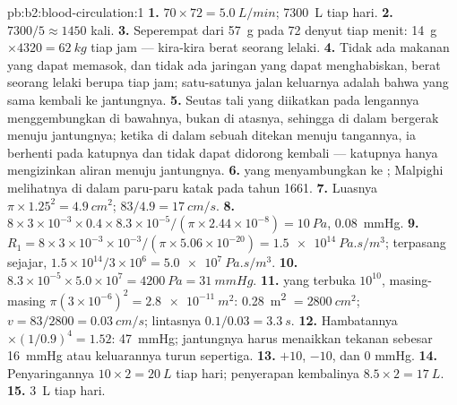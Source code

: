 \begin{solution}{pb:b2:blood-circulation:1}
\textbf{1.} $70\times 72 = \qty{5.0}{L/min}$; \qty{7300}{L} tiap hari.
\textbf{2.} $7300/5 \approx 1450$ kali.
\textbf{3.} Seperempat dari \qty{57}{g} pada 72 denyut tiap menit: \qty{14}{g}
$\times 4320 = \qty{62}{kg}$ tiap jam --- kira-kira berat seorang lelaki.
\textbf{4.} Tidak ada makanan yang dapat memasok, dan tidak ada
jaringan yang dapat menghabiskan, berat seorang lelaki berupa 
tiap jam; satu-satunya jalan keluarnya adalah bahwa  yang sama
kembali ke jantungnya.
\textbf{5.} Seutas tali yang diikatkan pada lengannya menggembungkan
 di bawahnya, bukan di atasnya, sehingga  di dalam 
bergerak menuju jantungnya; ketika  di dalam sebuah  ditekan
menuju tangannya, ia berhenti pada katupnya dan tidak dapat didorong
kembali --- katupnya hanya mengizinkan aliran menuju jantungnya.
\textbf{6.}  yang menyambungkan  ke ; Malpighi
melihatnya di dalam paru-paru katak pada tahun 1661.
\textbf{7.} Luasnya $\pi\times 1.25^{2} = \qty{4.9}{cm^2}$; $83/4.9 =
\qty{17}{cm/s}$.
\textbf{8.} $8\times 3\times 10^{-3}\times 0.4\times 8.3\times
10^{-5}/(\pi\times 2.44\times 10^{-8}) = \qty{10}{Pa}$, \qty{0.08}{mmHg}.
\textbf{9.} $R_{1} = 8\times 3\times 10^{-3}\times 10^{-3}/(\pi\times
5.06\times 10^{-20}) = \qty{1.5e14}{Pa.s/m^3}$; terpasang sejajar,
$1.5\times 10^{14}/3\times 10^{6} = \qty{5.0e7}{Pa.s/m^3}$.
\textbf{10.} $8.3\times 10^{-5}\times 5.0\times 10^{7} = \qty{4200}{Pa}
= \qty{31}{mmHg}$.
\textbf{11.}  yang terbuka $10^{10}$, masing-masing $\pi(3\times 10^{-6})^{2}
= \qty{2.8e-11}{m^2}$: \qty{0.28}{m^2} $= \qty{2800}{cm^2}$; $v =
83/2800 = \qty{0.03}{cm/s}$; lintasnya $0.1/0.03 = \qty{3.3}{s}$.
\textbf{12.} Hambatannya $\times(1/0.9)^{4} = 1.52$: \qty{47}{mmHg};
jantungnya harus menaikkan tekanan  sebesar \qty{16}{mmHg}
atau keluarannya turun sepertiga.
\textbf{13.} $+10$, $-10$, dan $0$ mmHg.
\textbf{14.} Penyaringannya $10\times 2 = \qty{20}{L}$ tiap hari;
penyerapan kembalinya $8.5\times 2 = \qty{17}{L}$.
\textbf{15.} \qty{3}{L}  tiap hari.

\end{solution}
